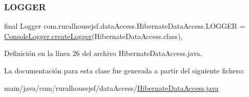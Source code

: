 \subsubsection{\texorpdfstring{LOGGER}{LOGGER}}
{\footnotesize\ttfamily final Logger com.\+ruralhousejsf.\+data\+Access.\+Hibernate\+Data\+Access.\+L\+O\+G\+G\+ER = \mbox{\hyperlink{classcom_1_1ruralhousejsf_1_1logger_1_1_console_logger_a520321643663e37d95761134a35505cd}{Console\+Logger.\+create\+Logger}}(Hibernate\+Data\+Access.\+class)\hspace{0.3cm}{\ttfamily [static]}, {\ttfamily [private]}}



Definición en la línea 26 del archivo Hibernate\+Data\+Access.\+java.



La documentación para esta clase fue generada a partir del siguiente fichero\+:\begin{DoxyCompactItemize}
\item 
main/java/com/ruralhousejsf/data\+Access/\mbox{\hyperlink{_hibernate_data_access_8java}{Hibernate\+Data\+Access.\+java}}\end{DoxyCompactItemize}

